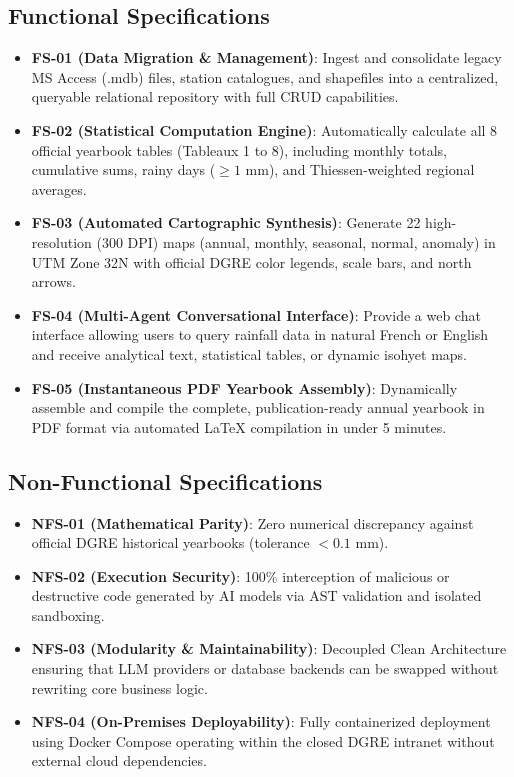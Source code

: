 \documentclass[12pt,a4paper]{report}
\begin{document}
\subsection{Functional Specifications}
\begin{itemize}
  \item \textbf{FS-01 (Data Migration \& Management)}: Ingest and consolidate legacy MS Access (.mdb) files, station catalogues, and shapefiles into a centralized, queryable relational repository with full CRUD capabilities.
  \item \textbf{FS-02 (Statistical Computation Engine)}: Automatically calculate all 8 official yearbook tables (Tableaux 1 to 8), including monthly totals, cumulative sums, rainy days ($\geq 1\text{ mm}$), and Thiessen-weighted regional averages.
  \item \textbf{FS-03 (Automated Cartographic Synthesis)}: Generate 22 high-resolution (300 DPI) maps (annual, monthly, seasonal, normal, anomaly) in UTM Zone 32N with official DGRE color legends, scale bars, and north arrows.
  \item \textbf{FS-04 (Multi-Agent Conversational Interface)}: Provide a web chat interface allowing users to query rainfall data in natural French or English and receive analytical text, statistical tables, or dynamic isohyet maps.
  \item \textbf{FS-05 (Instantaneous PDF Yearbook Assembly)}: Dynamically assemble and compile the complete, publication-ready annual yearbook in PDF format via automated LaTeX compilation in under 5 minutes.
\end{itemize}

\subsection{Non-Functional Specifications}
\begin{itemize}
  \item \textbf{NFS-01 (Mathematical Parity)}: Zero numerical discrepancy against official DGRE historical yearbooks (tolerance $< 0.1\text{ mm}$).
  \item \textbf{NFS-02 (Execution Security)}: 100\% interception of malicious or destructive code generated by AI models via AST validation and isolated sandboxing.
  \item \textbf{NFS-03 (Modularity \& Maintainability)}: Decoupled Clean Architecture ensuring that LLM providers or database backends can be swapped without rewriting core business logic.
  \item \textbf{NFS-04 (On-Premises Deployability)}: Fully containerized deployment using Docker Compose operating within the closed DGRE intranet without external cloud dependencies.
\end{itemize}
\end{document}
